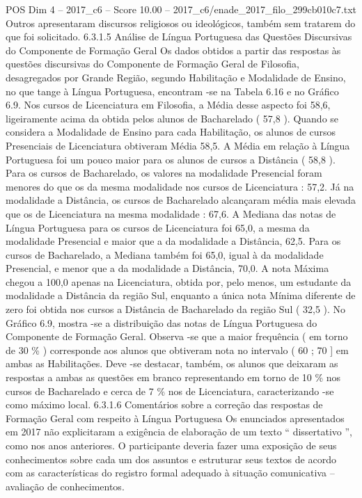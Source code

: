 \begin{textsample}{POS Dim 4 – 2017\_c6 – Score 10.00 – 2017\_c6/enade\_2017\_filo\_299cb010c7.txt}
Outros apresentaram discursos religiosos ou ideológicos, também sem tratarem do que foi solicitado. 6.3.1.5 Análise de Língua Portuguesa das Questões Discursivas do Componente de Formação Geral Os dados obtidos a partir das respostas às questões discursivas do Componente de Formação Geral de Filosofia, desagregados por Grande Região, segundo Habilitação e Modalidade de Ensino, no que tange à Língua Portuguesa, encontram -se na Tabela 6.16 e no Gráfico 6.9.
Nos cursos de Licenciatura em Filosofia, a Média desse aspecto foi 58,6, ligeiramente acima da obtida pelos alunos de Bacharelado ( 57,8 ).
Quando se considera a Modalidade de Ensino para cada Habilitação, os alunos de cursos Presenciais de Licenciatura obtiveram Média 58,5.
A Média em relação à Língua Portuguesa foi um pouco maior para os alunos de cursos a Distância ( 58,8 ).
Para os cursos de Bacharelado, os valores na modalidade Presencial foram menores do que os da mesma modalidade nos cursos de Licenciatura : 57,2.
Já na modalidade a Distância, os cursos de Bacharelado alcançaram média mais elevada que os de Licenciatura na mesma modalidade : 67,6.
A Mediana das notas de Língua Portuguesa para os cursos de Licenciatura foi 65,0, a mesma da modalidade Presencial e maior que a da modalidade a Distância, 62,5.
Para os cursos de Bacharelado, a Mediana também foi 65,0, igual à da modalidade Presencial, e menor que a da modalidade a Distância, 70,0.
A nota Máxima chegou a 100,0 apenas na Licenciatura, obtida por, pelo menos, um estudante da modalidade a Distância da região Sul, enquanto a única nota Mínima diferente de zero foi obtida nos cursos a Distância de Bacharelado da região Sul ( 32,5 ).
No Gráfico 6.9, mostra -se a distribuição das notas de Língua Portuguesa do Componente de Formação Geral.
Observa -se que a maior frequência ( em torno de 30 \% ) corresponde aos alunos que obtiveram nota no intervalo ( 60 ; 70 ] em ambas as Habilitações.
Deve -se destacar, também, os alunos que deixaram as respostas a ambas as questões em branco representando em torno de 10 \% nos cursos de Bacharelado e cerca de 7 \% nos de Licenciatura, caracterizando -se como máximo local. 6.3.1.6 Comentários sobre a correção das respostas de Formação Geral com respeito à Língua Portuguesa Os enunciados apresentados em 2017 não explicitaram a exigência de elaboração de um texto “ dissertativo ”, como nos anos anteriores.
O participante deveria fazer uma exposição de seus conhecimentos sobre cada um dos assuntos e estruturar seus textos de acordo com as características do registro formal adequado à situação comunicativa – avaliação de conhecimentos.

\end{textsample}
